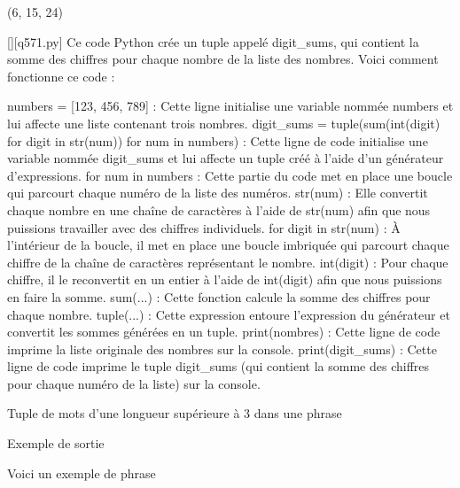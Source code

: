 (6, 15, 24)
        \par
        \begin{solution}
            \renewcommand{\nomfichier}{q571.py}
            \pythonfile{\chemincode \nomfichier}[][\nomfichier]
            Ce code Python crée un tuple appelé digit\_sums, qui contient la somme des chiffres pour chaque nombre de la liste des nombres. Voici comment fonctionne ce code :

    numbers = [123, 456, 789] : Cette ligne initialise une variable nommée numbers et lui affecte une liste contenant trois nombres.
    digit\_sums = tuple(sum(int(digit) for digit in str(num)) for num in numbers) : Cette ligne de code initialise une variable nommée digit\_sums et lui affecte un tuple créé à l'aide d'un générateur d'expressions.
        for num in numbers : Cette partie du code met en place une boucle qui parcourt chaque numéro de la liste des numéros.
        str(num) : Elle convertit chaque nombre en une chaîne de caractères à l'aide de str(num) afin que nous puissions travailler avec des chiffres individuels.
        for digit in str(num) : À l'intérieur de la boucle, il met en place une boucle imbriquée qui parcourt chaque chiffre de la chaîne de caractères représentant le nombre.
        int(digit) : Pour chaque chiffre, il le reconvertit en un entier à l'aide de int(digit) afin que nous puissions en faire la somme.
        sum(...) : Cette fonction calcule la somme des chiffres pour chaque nombre.
        tuple(...) : Cette expression entoure l'expression du générateur et convertit les sommes générées en un tuple.
    print(nombres) : Cette ligne de code imprime la liste originale des nombres sur la console.
    print(digit\_sums) : Cette ligne de code imprime le tuple digit\_sums (qui contient la somme des chiffres pour chaque numéro de la liste) sur la console.
        \end{solution}
        

        \question
        Tuple de mots d'une longueur supérieure à 3 dans une phrase

Exemple de sortie

Voici un exemple de phrase

